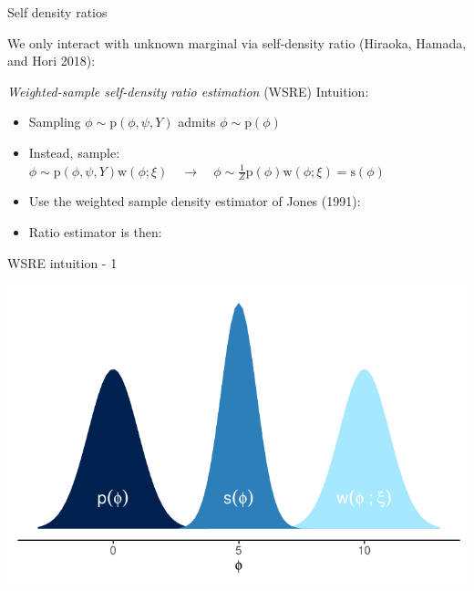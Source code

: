 \documentclass[10pt,ignorenonframetext,]{beamer}
\providecommand{\tightlist}{%
  \setlength{\itemsep}{0pt}\setlength{\parskip}{0pt}}
\newcommand{\pd}{\text{p}}
\newcommand{\w}{\text{w}}
\newcommand{\s}{\text{s}}
\begin{document}
\begin{frame}{Self density ratios}

We only interact with unknown marginal via self-density ratio (Hiraoka,
Hamada, and Hori 2018):


\emph{Weighted-sample self-density ratio estimation} (WSRE) Intuition:

\begin{itemize}
\tightlist
\item
  Sampling \(\phi \sim \pd(\phi, \psi, Y)\) admits
  \(\phi \sim \pd(\phi)\)
\item
  Instead, sample:\\
  \(\phi \sim \pd(\phi, \psi, Y) \w(\phi; \xi) \quad \rightarrow \quad \phi \sim \frac{1}{Z}\pd(\phi)\w(\phi; \xi) = \s(\phi)\)
\item
  Use the weighted sample density estimator of Jones (1991):
  
\item
  Ratio estimator is then:\\
  
\end{itemize}

\end{frame}

\begin{frame}{WSRE intuition - 1}

\begin{center}\includegraphics[width=1\linewidth]{figures/weighted-dist-plot} \end{center}

\end{frame}
\end{document}
